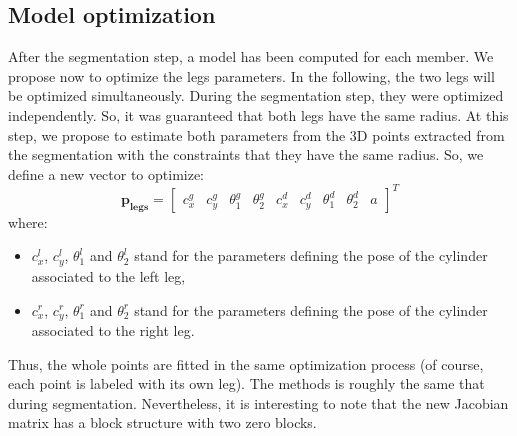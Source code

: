 \documentclass[letterpaper, 10 pt, conference]{ieeeconf}
\begin{document}
\subsection{Model optimization}
After the segmentation step, a model has been computed for each member. We propose now to optimize the legs parameters.
%
In the following, the two legs will be {optimized simultaneously}. During the segmentation step, they were optimized independently. So, it was guaranteed that both legs have the same radius. At this step, we propose to estimate both parameters from the 3D points extracted from the segmentation with the constraints that they have the same radius. So, we define a new vector to optimize:
\begin{equation}
	\mathbf{p_{legs}} = 
	\begin{bmatrix}
		c_x^g & c_y^g & \theta_1^g & \theta_2^g & c_x^d & c_y^d & \theta_1^d & \theta_2^d & a
	\end{bmatrix}^T
\end{equation}
where:
\begin{itemize}
	\item $c_x^l$, $c_y^l$, $\theta_1^l$ and $\theta_2^l$ stand for the parameters defining the pose of the cylinder associated to the left leg,
	\item $c_x^r$, $c_y^r$, $\theta_1^r$ and $\theta_2^r$ stand for the parameters defining the pose of the cylinder associated to the right leg.
\end{itemize}
Thus, the whole points are fitted in the same optimization process (of course, each point is labeled with its own leg). The methods is roughly the same that during segmentation. Nevertheless, it is interesting to note that the new Jacobian matrix has a block structure with two zero blocks.

\end{document}
